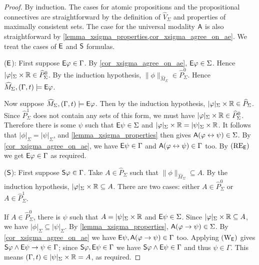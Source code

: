 \begin{proof}
    By induction. The cases for atomic propositions and
    the propositional connectives are straightforward by the definition of
    $\widehat{V}_\Sigma$ and properties of
    maximally consistent sets. The case for the universal modality $\A$ is also
    straightforward by \cref{lemma_xsigma_properties,cor_xsigma_agree_on_ae}.
    We treat the cases of $\E$ and $\S$
    formulas.

    ($\E$): First suppose $\E\phi \in \Gamma$. By
    \cref{cor_xsigma_agree_on_ae}, $\E\phi \in \Sigma$. Hence $|\phi|_\Sigma
    \times \R \in \widehat{P}_\Sigma^0$. By the induction hypothesis,
    $\|\phi\|_{\widehat{M}_\Sigma} \in \widehat{P}_\Sigma^0$. Hence
    $\widehat{M}_\Sigma, (\Gamma, t) \models \E\phi$.

    Now suppose $\widehat{M}_\Sigma, (\Gamma, t) \models \E\phi$.  Then by the
    induction hypothesis, $|\phi|_\Sigma \times \R \in \widehat{P}_\Sigma$.
    Since $\widehat{P}_\Sigma^1$ does not contain any sets of this form, we
    must have $|\phi|_\Sigma \times \R \in \widehat{P}_\Sigma^0$. Therefore
    there is some $\psi$ such that $\E\psi \in \Sigma$ and $|\phi|_\Sigma
    \times \R = |\psi|_\Sigma \times \R$.  It follows that $|\phi|_\Sigma =
    |\psi|_\Sigma$, and \cref{lemma_xsigma_properties} then gives $\A(\phi
    \liff \psi) \in \Sigma$. By \cref{cor_xsigma_agree_on_ae}, we have $\E\psi
    \in \Gamma$ and $\A(\phi \liff \psi) \in \Gamma$ too. By $\reE$ we get
    $\E\phi \in \Gamma$ as required.

    ($\S$): First suppose $\S\phi \in \Gamma$. Take $A \in \widehat{P}_\Sigma$
    such that $\|\phi\|_{\widehat{M}_\Sigma} \subseteq A$. By the induction
    hypothesis, $|\phi|_\Sigma \times \R \subseteq A$. There are two cases:
    either $A \in \widehat{P}_\Sigma^0$ or $A \in \widehat{P}_\Sigma^1$.

    If $A \in \widehat{P}_\Sigma^0$, there is $\psi$ such that $A =
    |\psi|_\Sigma \times \R$ and $\E\psi \in \Sigma$.  Since $|\phi|_\Sigma
    \times \R \subseteq A$, we have $|\phi|_\Sigma \subseteq |\psi|_\Sigma$.
    By \cref{lemma_xsigma_properties}, $\A(\phi \limplies \psi) \in \Sigma$. By
    \cref{cor_xsigma_agree_on_ae} we have $\E\psi, \A(\phi \limplies \psi) \in
    \Gamma$ too. Applying $\weakeningE$ gives $\S\phi \land \E\psi \limplies
    \psi \in \Gamma$; since $\S\phi, \E\psi \in \Gamma$ we have $\S\phi \land
    \E\psi \in \Gamma$ and thus $\psi \in \Gamma$. This means $(\Gamma, t) \in
    |\psi|_\Sigma \times \R = A$, as required.


\end{proof}
